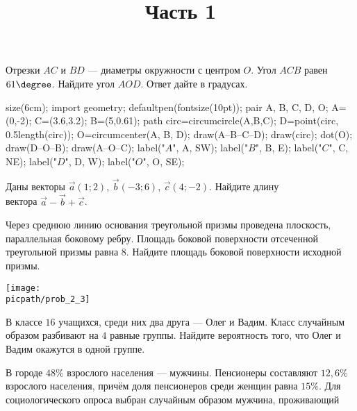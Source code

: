 \begin{training}[2]
	\title{Часть 1}
	\egepreambone
	\begin{listofex}
	\item
	\begin{minipage}[t]{\bodywidth}
		Отрезки \(AC\) и \(BD\) --- диаметры окружности с центром \(O\). Угол \(ACB\) равен \(61\degree\). Найдите угол \(AOD\). Ответ дайте в градусах.
		\foranswer
	\end{minipage}
	\gapwidth
	\begin{minipage}[t]{\picwidth}
		\begin{asy}
		size(6cm);
		import geometry;
		defaultpen(fontsize(10pt));
		pair A, B, C, D, O;
		A=(0,-2); C=(3.6,3.2); B=(5,0.61);
		path circ=circumcircle(A,B,C);
		D=point(circ, 0.5length(circ));
		O=circumcenter(A, B, D);
		draw(A--B--C--D);
		draw(circ);
		dot(O);
		draw(D--O--B);
		draw(A--O--C);
		label("$A$", A, SW);
		label("$B$", B, E);
		label("$C$", C, NE);
		label("$D$", D, W);
		label("$O$", O, SE);
		\end{asy}
	\end{minipage}
		\item
		Даны векторы \(\overrightarrow{a}(1;2)\), \(\overrightarrow{b} (-3;6)\), \(\overrightarrow{c} (4;-2)\). Найдите длину\\ вектора \(\overrightarrow{a}-\overrightarrow{b}+\overrightarrow{c}\).
		\foranswer
		\item
		\begin{minipage}[t]{\bodywidth}
			Через среднюю линию основания треугольной призмы проведена плоскость, параллельная боковому ребру. Площадь боковой поверхности отсеченной треугольной призмы равна \( 8 \). Найдите площадь боковой поверхности исходной призмы.
			\foranswer
		\end{minipage}
		\gapwidth
		\begin{minipage}[t]{\picwidth}
			\texttt{[image: \\picpath/prob\_2\_3]}
		\end{minipage}
		\item В классе \( 16 \) учащихся, среди них два друга --- Олег и Вадим. Класс случайным образом разбивают на \( 4 \) равные группы. Найдите вероятность того, что Олег и Вадим окажутся в одной группе.
		\foranswer
		\item В городе \(48\%\) взрослого населения --- мужчины. Пенсионеры составляют \(12,6\%\) взрослого населения, причём доля пенсионеров среди женщин равна \(15\%\). Для социологического опроса выбран случайным образом мужчина, проживающий

\end{listofex}
\end{training}
